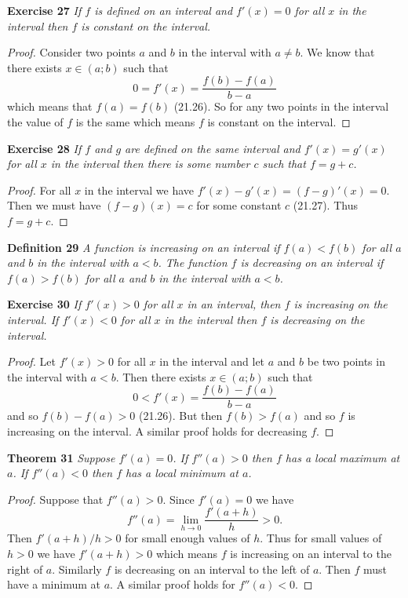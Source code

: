 \documentclass{article}
\begin{document}
\begin{flushleft}
\textbf{Exercise 27}
\textsl{If $f$ is defined on an interval and $f'(x) = 0$ for all $x$ in the interval then $f$ is constant on the interval.}
\begin{proof}
Consider two points $a$ and $b$ in the interval with $a \neq b$. We know that there exists $x \in (a;b)$ such that
\[
0 = f'(x) = \frac{f(b) - f(a)}{b-a}
\]
which means that $f(a) = f(b)$ (21.26). So for any two points in the interval the value of $f$ is the same which means $f$ is constant on the interval.
\end{proof}

\textbf{Exercise 28}
\textsl{If $f$ and $g$ are defined on the same interval and $f'(x) = g'(x)$ for all $x$ in the interval then there is some number $c$ such that $f = g + c$.}
\begin{proof}
For all $x$ in the interval we have $f'(x) - g'(x) = (f-g)' (x) = 0$. Then we must have $(f-g) (x) = c$ for some constant $c$ (21.27). Thus $f = g + c$.
\end{proof}

\textbf{Definition 29}
\textsl{A function is increasing on an interval if $f(a) < f(b)$ for all $a$ and $b$ in the interval with $a < b$. The function $f$ is decreasing on an interval if $f(a) > f(b)$ for all $a$ and $b$ in the interval with $a < b$.}\newline

\textbf{Exercise 30}
\textsl{If $f'(x) > 0$ for all $x$ in an interval, then $f$ is increasing on the interval. If $f'(x) < 0$ for all $x$ in the interval then $f$ is decreasing on the interval.}
\begin{proof}
Let $f'(x) > 0$ for all $x$ in the interval and let $a$ and $b$ be two points in the interval with $a < b$. Then there exists $x \in (a;b)$ such that
\[
0 < f'(x) = \frac{f(b) - f(a)}{b-a}
\]
and so $f(b) - f(a) > 0$ (21.26). But then $f(b) > f(a)$ and so $f$ is increasing on the interval. A similar proof holds for decreasing $f$.
\end{proof}

\textbf{Theorem 31}
\textsl{Suppose $f'(a) = 0$. If $f''(a) > 0$ then $f$ has a local maximum at $a$. If $f''(a) < 0$ then $f$ has a local minimum at $a$.}
\begin{proof}
Suppose that $f''(a) > 0$. Since $f'(a) = 0$ we have
\[
f'' (a) = \lim_{h \rightarrow 0} \frac{f'(a+h)}{h} > 0.
\]
Then $f'(a+h)/h > 0$ for small enough values of $h$. Thus for small values of $h > 0$ we have $f'(a+h) > 0$ which means $f$ is increasing on an interval to the right of $a$. Similarly $f$ is decreasing on an interval to the left of $a$. Then $f$ must have a minimum at $a$. A similar proof holds for $f''(a) < 0$.
\end{proof}


\end{flushleft}
\end{document}
